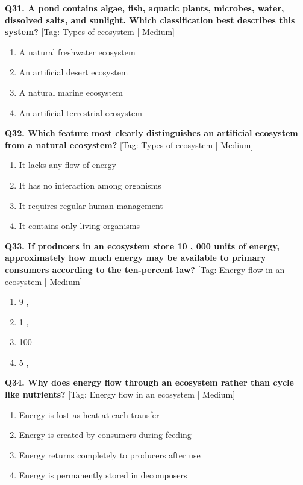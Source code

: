 \noindent\textbf{Q31. A pond contains algae, fish, aquatic plants, microbes, water, dissolved salts, and sunlight. Which classification best describes this system?} \hfill [Tag: Types of ecosystem | Medium]
\begin{enumerate}[label=(\alph*),topsep=2pt,itemsep=1pt,partopsep=0pt,parsep=0pt]
    \item {A natural freshwater ecosystem}
    \item {An artificial desert ecosystem}
    \item {A natural marine ecosystem}
    \item {An artificial terrestrial ecosystem}
\end{enumerate}
\vspace{2mm}

\noindent\textbf{Q32. Which feature most clearly distinguishes an artificial ecosystem from a natural ecosystem?} \hfill [Tag: Types of ecosystem | Medium]
\begin{enumerate}[label=(\alph*),topsep=2pt,itemsep=1pt,partopsep=0pt,parsep=0pt]
    \item {It lacks any flow of energy}
    \item {It has no interaction among organisms}
    \item {It requires regular human management}
    \item {It contains only living organisms}
\end{enumerate}
\vspace{2mm}

\noindent\textbf{Q33. If producers in an ecosystem store 10 , 000 units of energy, approximately how much energy may be available to primary consumers according to the ten-percent law?} \hfill [Tag: Energy flow in an ecosystem | Medium]
\begin{enumerate}[label=(\alph*),topsep=2pt,itemsep=1pt,partopsep=0pt,parsep=0pt]
    \item {9 ,}
    \item {1 ,}
    \item {100}
    \item {5 ,}
\end{enumerate}
\vspace{2mm}

\noindent\textbf{Q34. Why does energy flow through an ecosystem rather than cycle like nutrients?} \hfill [Tag: Energy flow in an ecosystem | Medium]
\begin{enumerate}[label=(\alph*),topsep=2pt,itemsep=1pt,partopsep=0pt,parsep=0pt]
    \item {Energy is lost as heat at each transfer}
    \item {Energy is created by consumers during feeding}
    \item {Energy returns completely to producers after use}
    \item {Energy is permanently stored in decomposers}
\end{enumerate}
\vspace{2mm}

